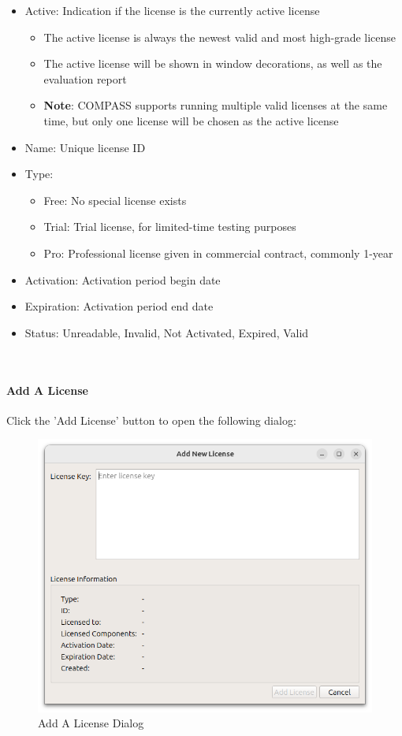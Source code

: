 \begin{itemize}
\item Active: Indication if the license is the currently active license
\begin{itemize}
\item The active license is always the newest valid and most high-grade license
\item The active license will be shown in window decorations, as well as the evaluation report
\item \textbf{Note}: COMPASS supports running multiple valid licenses at the same time, but only one license will be chosen as the active license
\end{itemize}
\item Name: Unique license ID
\item Type:
\begin{itemize}
\item Free: No special license exists
\item Trial: Trial license, for limited-time testing purposes
\item Pro: Professional license given in commercial contract, commonly 1-year
\end{itemize}
\item Activation: Activation period begin date
\item Expiration: Activation period end date
\item Status: Unreadable, Invalid, Not Activated, Expired, Valid
\end{itemize}
\ \\

\paragraph {Add A License}

Click the 'Add License' button to open the following dialog:

\begin{figure}[H]
    \includegraphics[width=14cm]{figures/configure_license_add.png}
  \caption{Add A License Dialog}
\end{figure}

